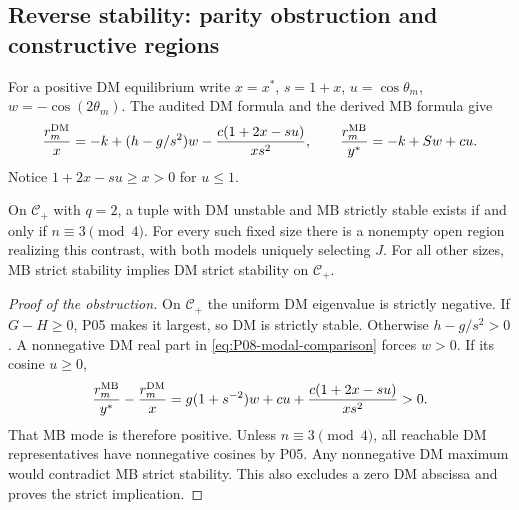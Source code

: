 \subsection{Reverse stability: parity obstruction and constructive regions}
For a positive DM equilibrium write $x=x^*$, $s=1+x$,
$u=\cos\theta_m$, $w=-\cos(2\theta_m)$. The audited DM formula and
the derived MB formula give
\begin{equation}
 \frac{r_m^{\mathrm{DM}}}x=-k+(h-g/s^2)w
       -\frac{c(1+2x-su)}{xs^2},\qquad
 \frac{r_m^{\mathrm{MB}}}{y^*}=-k+Sw+cu.
 \label{eq:P08-modal-comparison}
\end{equation}
Notice $1+2x-su\ge x>0$ for $u\le1$.
\begin{theorem}
\label{thm:P08-reverse}
On $\mathcal C_+$ with $q=2$, a tuple with DM unstable and MB strictly
stable exists if and only if $n\equiv3\pmod4$. For every such fixed
size there is a nonempty open region realizing this contrast, with both
models uniquely selecting $J$. For all other sizes, MB strict stability
implies DM strict stability on $\mathcal C_+$.
\end{theorem}
\begin{proof}[Proof of the obstruction]
On $\mathcal C_+$ the uniform DM eigenvalue is strictly negative.
If $G-H\ge0$, P05 makes it largest, so DM is strictly stable.
Otherwise $h-g/s^2>0$. A nonnegative DM real part in
\eqref{eq:P08-modal-comparison} forces $w>0$. If its cosine $u\ge0$,
\begin{equation}
 \frac{r_m^{\mathrm{MB}}}{y^*}-\frac{r_m^{\mathrm{DM}}}x
 =g(1+s^{-2})w+cu+\frac{c(1+2x-su)}{xs^2}>0.
 \label{eq:P08-modal-gap}
\end{equation}
That MB mode is therefore positive. Unless $n\equiv3\pmod4$, all
reachable DM representatives have nonnegative cosines by P05. Any
nonnegative DM maximum would contradict MB strict stability. This also
excludes a zero DM abscissa and proves the strict implication.
\end{proof}
